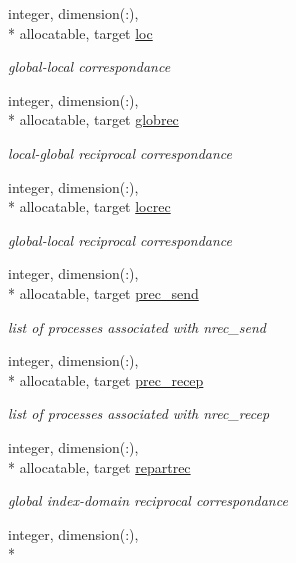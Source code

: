\begin{DoxyCompactItemize}
integer, dimension(\-:), \\*
allocatable, target \hyperlink{classdomdec_aab28c270e201c2fea1dae1fe969ef66f}{loc}
\begin{DoxyCompactList}\small\item\em global-\/local correspondance \end{DoxyCompactList}\item 
integer, dimension(\-:), \\*
allocatable, target \hyperlink{classdomdec_a38e7d056926314b002bd5a212584ff11}{globrec}
\begin{DoxyCompactList}\small\item\em local-\/global reciprocal correspondance \end{DoxyCompactList}\item 
integer, dimension(\-:), \\*
allocatable, target \hyperlink{classdomdec_a881232db39ab98dcfb865d753170a69e}{locrec}
\begin{DoxyCompactList}\small\item\em global-\/local reciprocal correspondance \end{DoxyCompactList}\item 
integer, dimension(\-:), \\*
allocatable, target \hyperlink{classdomdec_ad353099c77cb5a206fbcd6fbca9cea8f}{prec\-\_\-send}
\begin{DoxyCompactList}\small\item\em list of processes associated with nrec\-\_\-send \end{DoxyCompactList}\item 
integer, dimension(\-:), \\*
allocatable, target \hyperlink{classdomdec_a567096a53173ef0bbf5ab415f6ba4e70}{prec\-\_\-recep}
\begin{DoxyCompactList}\small\item\em list of processes associated with nrec\-\_\-recep \end{DoxyCompactList}\item 
integer, dimension(\-:), \\*
allocatable, target \hyperlink{classdomdec_aeabaca57aab399a825da41e1915339ab}{repartrec}
\begin{DoxyCompactList}\small\item\em global index-\/domain reciprocal correspondance \end{DoxyCompactList}\item 
integer, dimension(\-:), \\*

\end{DoxyCompactItemize}

